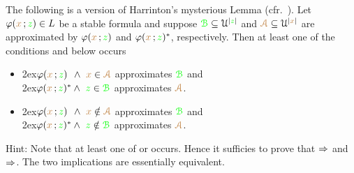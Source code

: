 \documentclass[creche.tex]{subfiles}
\begin{document}
\begin{exercise}\label{ex_harrington}
\def\grB{{\gr{\EuScript B}}}
\def\mrA{{\mr{\EuScript A}}}
The following is a version of Harrinton's mysterious 
Lemma (cfr.~\cite[Lemma 8.3.4]{TZ}).
Let $\varphi({\color{brown} x}\,;{\color{green} z})\in L$ be a stable formula and suppose $\grB\subseteq\U^{|{\gr z}|}$ and $\mrA\subseteq\U^{|{\mr x}|}$ are approximated by $\varphi({\color{brown} x}\,;{\color{green} z})$ and  $\varphi({\color{brown} x}\,;{\color{green} z})^*$, respectively.
Then at least one of the conditions  and  below occurs

\begin{itemize}
\item[1.]
\kern2ex$\phi({\mr x}\,;{\gr z})^{\phantom{*}}\wedge\ {\mr x}\in{\mrA}$ approximates $\grB$ and\\
\kern2ex$\phi({\mr x}\,;{\gr z})^*\wedge\ {\gr z}\in{\grB}$ approximates $\mrA$.

\item[2.]
\kern2ex$\phi({\mr x}\,;{\gr z})^{\phantom{*}}\wedge\ {\mr x}\notin{\mrA}$ approximates $\grB$ and\\
\kern2ex$\phi({\mr x}\,;{\gr z})^*\wedge\ {\gr z}\notin{\grB}$ approximates $\mrA$.

\end{itemize}
Hint: Note that at least one of  or  occurs.
Hence it sufficies to prove that $\Rightarrow$ and $\Rightarrow$. The two implications are essentially equivalent.
% 
% 
% 
% 
% 
% 
% 
% 
% 
% 
\end{exercise}
\end{document}

